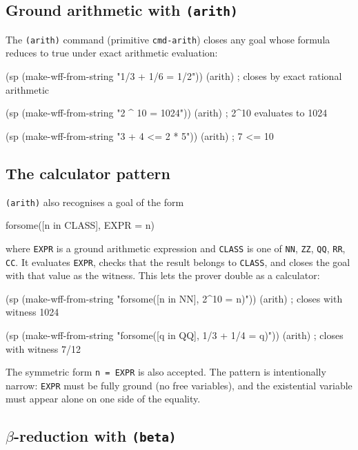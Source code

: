 \subsection{Ground arithmetic with \texttt{(arith)}}

The \texttt{(arith)} command (primitive \texttt{cmd-arith}) closes any
goal whose formula reduces to true under exact arithmetic evaluation:

\begin{VNBcode}
(sp (make-wff-from-string "1/3 + 1/6 = 1/2"))
(arith)                              ; closes by exact rational arithmetic

(sp (make-wff-from-string "2 ^ 10 = 1024"))
(arith)                              ; 2^10 evaluates to 1024

(sp (make-wff-from-string "3 + 4 <= 2 * 5"))
(arith)                              ; 7 <= 10
\end{VNBcode}

\subsection{The calculator pattern}

\texttt{(arith)} also recognises a goal of the form
\begin{VNBsnip}
forsome([n in CLASS], EXPR = n)
\end{VNBsnip}
where \texttt{EXPR} is a ground arithmetic expression and \texttt{CLASS}
is one of \texttt{NN}, \texttt{ZZ}, \texttt{QQ}, \texttt{RR},
\texttt{CC}.  It evaluates \texttt{EXPR}, checks that the result belongs
to \texttt{CLASS}, and closes the goal with that value as the witness.
This lets the prover double as a calculator:

\begin{VNBcode}
(sp (make-wff-from-string "forsome([n in NN], 2^10 = n)"))
(arith)   ; closes with witness 1024

(sp (make-wff-from-string "forsome([q in QQ], 1/3 + 1/4 = q)"))
(arith)   ; closes with witness 7/12
\end{VNBcode}

\begin{remark}
The symmetric form \texttt{n = EXPR} is also accepted.
The pattern is intentionally narrow: \texttt{EXPR} must be fully ground
(no free variables), and the existential variable must appear alone on
one side of the equality.
\end{remark}

\subsection{\texorpdfstring{$\beta$}{beta}-reduction with \texttt{(beta)}}

